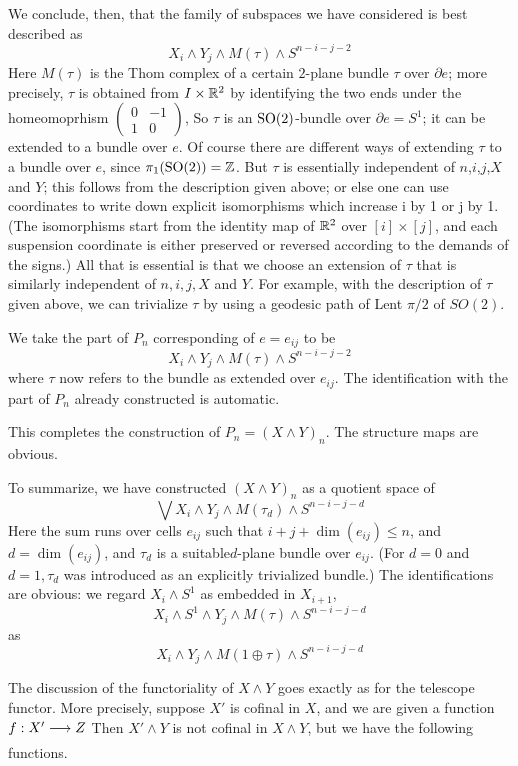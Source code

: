 \documentclass[../main]{subfiles}
\begin{document}
We conclude, then, that the family of subspaces we have considered is best described as 
\[X_i\wedge Y_j\wedge M(\tau) \wedge S^{n-i-j-2} \]
Here $M(\tau)$ is the Thom complex of a certain $2$-plane bundle $\tau$ over $\partial e$; more precisely, $\tau$ is obtained from $I\times \mathbb{R}^2$ by identifying the two ends under the homeomoprhism $\begin{pmatrix}0&-1\\ 1&0 \end{pmatrix}$, So $\tau$ is an $\mathrm{SO}(2)$-bundle over $\partial e=S^1$; it can be extended to a bundle over $e$. Of course there are different ways of extending $\tau$ to a bundle over $e$, since $\pi_1(\mathrm{SO}(2))=\mathbb{Z}$. But $\tau$ is essentially independent of $n$,$i$,$j$,$X$ and $Y$;
this follows from the description given above; or else one can use
coordinates to write down explicit isomorphisms which increase i by 1
 or j by 1. (The isomorphisms start from the identity map of $\mathbb{R}^2$ over $[i]\times [j]$, and each suspension coordinate is either preserved or reversed
according to the demands of the signs.) All that is essential is that we
choose an extension of $\tau$ that is similarly independent of $n,i,j,X$ and $Y$. For example, with the description of $\tau$ given above, we can trivialize $\tau$ by using a geodesic path of Lent $\pi/2$ of $SO(2)$.

We take the part of $P_n$ corresponding of $e=e_{ij}$ to be \[X_i\wedge Y_j \wedge M(\tau) \wedge S^{n-i-j-2}\]
where $\tau$ now refers to the bundle as extended over $e_{ij}$. The identification with the part of $P_n$ already constructed is automatic. 

This completes the construction of $P_n=(X\wedge Y)_n$. The structure maps are obvious.

To summarize, we have constructed $(X\wedge Y)_n$ as a quotient space of \[\bigvee X_i\wedge Y_j \wedge M(\tau_d)\wedge S^{n-i-j-d}\]
Here the sum runs over cells $e_{ij}$ such that $i+j+\dim(e_{ij})\leq n$, and $d=\dim(e_{ij})$, and $\tau_d$ is a suitable$d$-plane bundle over $e_{ij}$. (For $d=0$ and $d=1,\tau_d$ was introduced as an explicitly trivialized bundle.) The identifications are obvious: we regard $X_i\wedge S^1$ as embedded in $X_{i+1}$,
\[X_i\wedge S^1 \wedge Y_j \wedge M(\tau) \wedge S^{n-i-j-d} \]
as
\[X_i\wedge Y_j\wedge M(1\oplus \tau) \wedge S^{n-i-j-d} \]

The discussion of the functoriality of $X\wedge Y$ goes exactly as for the telescope functor. More precisely, suppose $X'$ is cofinal in $X$, and we are given a function $f:X'\lar{}Z$ Then $X'\wedge Y$ is not cofinal in $X\wedge Y$, but we have the following functions.
\end{document}
